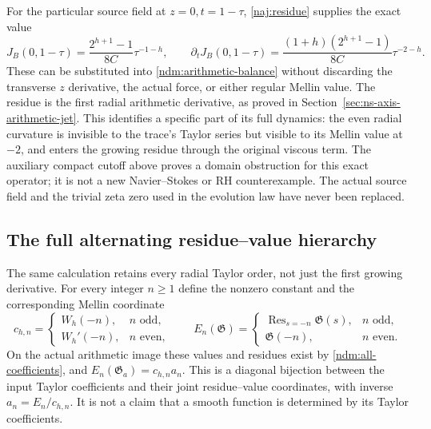 For the particular source field at \(z=0,t=1-\tau\),
\eqref{naj:residue} supplies the exact value
\[
 J_B(0,1-\tau)=\frac{2^{h+1}-1}{8C}\tau^{-1-h},
 \qquad
 \partial_tJ_B(0,1-\tau)
    =\frac{(1+h)(2^{h+1}-1)}{8C}\tau^{-2-h}.
\]
These can be substituted into \eqref{ndm:arithmetic-balance} without
discarding the transverse \(z\) derivative, the actual force, or
either regular Mellin value. The residue is the first radial
arithmetic derivative, as proved in Section~\ref{sec:ns-axis-arithmetic-jet}.
This identifies a specific part of its full dynamics: the even
radial curvature is invisible to the trace's Taylor series but
visible to its Mellin value at \(-2\), and enters the growing residue
through the original viscous term.
The auxiliary compact cutoff above proves a domain obstruction for
this exact operator; it is not a new Navier--Stokes or RH
counterexample. The actual source field and the trivial zeta zero
used in the evolution law have never been replaced.

\subsection{The full alternating residue--value hierarchy}

The same calculation retains every radial Taylor order, not just
the first growing derivative. For every integer \(n\ge1\) define
the nonzero constant and the corresponding Mellin coordinate
\[
 c_{h,n}=
 \begin{cases}W_h(-n),&n\text{ odd},\\W_h'(-n),&n\text{ even},\end{cases}
 \qquad
 E_n(\mathfrak G)=
 \begin{cases}
   \operatorname{Res}_{s=-n}\mathfrak G(s),&n\text{ odd},\\
   \mathfrak G(-n),&n\text{ even}.
 \end{cases}
\]
On the actual arithmetic image these values and residues exist by
\eqref{ndm:all-coefficients}, and
\(E_n(\mathfrak G_a)=c_{h,n}a_n\).
This is a diagonal bijection between the input Taylor coefficients
and their joint residue--value coordinates, with inverse
\(a_n=E_n/c_{h,n}\). It is not a claim that a smooth function is
determined by its Taylor coefficients.

